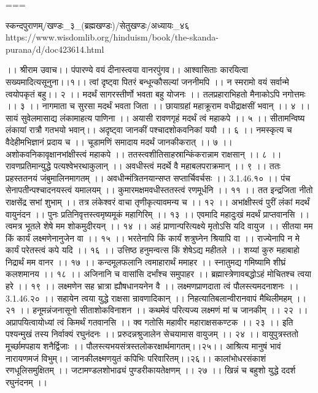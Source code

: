 ===

स्कन्दपुराणम्/खण्डः_३_(ब्रह्मखण्डः)/सेतुखण्डः/अध्यायः_४६
https://www.wisdomlib.org/hinduism/book/the-skanda-purana/d/doc423614.html

।। श्रीराम उवाच।।
पंपारण्ये वयं दीनास्त्वया वानरपुंगव।।
आश्वासिताः कारयित्वा सख्यमादित्यसूनुना।।१।।
त्वां दृष्ट्वा पितरं बन्धून्कौसल्यां जननीमपि ।।
न स्मरामो वयं सर्वान्मे त्वयोपकृतं बहु।। २ ।।
मदर्थं सागरस्तीर्णो भवता बहु योजनः ।।
तलप्रहाराभिहतो मैनाकोऽपि नगोत्तमः ।। ३ ।।
नागमाता च सुरसा मदर्थं भवता जिता ।।
छायाग्रहां महाक्रूराम वधीद्राक्षसीं भवान् ।। ४ ।।
सायं सुवेलमासाद्य लंकामाहत्य पाणिना ।।
अयासी रावणगृहं मदर्थं त्वं महाकपे ।। ५ ।।
सीतामन्विष्य लंकायां रात्रौ गतभयो भवान्।।
अदृष्ट्वा जानकीं पश्चादशोकवनिकां ययौ ।। ६ ।।
नमस्कृत्य च वैदेहीमभिज्ञानं प्रदाय च ।।
चूडामणिं समादाय मदर्थं जानकीकरात् ।। ७ ।।
अशोकवनिकावृक्षानभांक्षीस्त्वं महाकपे ।।
ततस्त्वशीतिसाहस्रान्किंकरान्नाम राक्षसान् ।। ८ ।।
रावणप्रतिमान्युद्धे पत्यश्वेभरथाकुलान् ।।
अवधीस्त्वं मदर्थे वै महाबलपराक्रमान् ।। ९ ।।
ततः प्रहस्ततनयं जंबुमालिनमागतम् ।।
अवधीन्मंत्रितनयान्सप्त सप्तार्चिवर्चसः ।। 3.1.46.१० ।।
पंच सेनापतीन्पश्चादनयस्त्वं यमालयम् ।।
कुमारमक्षमवधीस्ततस्त्वं रणमूर्धनि ।। ११ ।।
तत इन्द्रजिता नीतो राक्षसेंद्र सभां शुभाम् ।।
तत्र लंकेश्वरं वाचा तृणीकृत्यावमन्य च ।। १२ ।।
अभांक्षीस्त्वं पुरीं लंकां मदर्थं वायुनंदन ।।
पुनः प्रतिनिवृत्तस्त्वमृष्यमूकं महागिरिम् ।। १३ ।।
एवमादि महादुःखं मदर्थं प्राप्तवानसि ।।
त्वमत्र भूतले शेषे मम शोकमुदीरयन् ।। १४ ।।
अहं प्राणान्परित्यक्ष्ये मृतोऽसि यदि वायुज ।।
सीतया मम किं कार्यं लक्ष्मणेनानुजेन वा ।। १५ ।।
भरतेनापि किं कार्यं शत्रुघ्नेन श्रियापि वा ।।
राज्येनापि न मे कार्यं परेतस्त्वं कपे यदि ।। १६ ।।
उत्तिष्ठ हनुमन्वत्स किं शेषेऽद्य महीतले ।।
शय्यां कुरु महाबाहो निद्रार्थं मम वानर ।। १७ ।।
कन्दमूलफलानि त्वमाहारार्थं ममाहर ।।
स्नातुमद्य गमिष्यामि शीघ्रं कलशमानय ।। १८ ।।
अजिनानि च वासांसि दर्भांश्च समुपाहर ।।
ब्रह्मास्त्रेणावबद्धोऽहं मोचितश्च त्वया हरे ।। १९ ।।
लक्ष्मणेन सह भ्रात्रा ह्यौषधानयनेन वै ।।
लक्ष्मणप्राणदाता त्वं पौलस्त्यमदनाशनः ।। 3.1.46.२० ।।
सहायेन त्वया युद्धे राक्षसा न्रावणादिकान् ।।
निहत्यातिबलान्वीरानवापं मैथिलीमहम् ।। २१ ।।
हनूमन्नंजनासूनो सीताशोकविनाशन ।।
कथमेवं परित्यज्य लक्ष्मणं मां च जानकीम् ।। २२ ।।
अप्रापयित्वायोध्यां त्वं किमर्थं गतवानसि ।।
क्व गतोसि महावीर महाराक्षसकण्टक ।। २३ ।।
इति पश्यन्मुखं तस्य निर्वाक्यं रघुनंदनः ।।
प्ररुदन्नश्रुजालेन सेचयामास वायुजम् ।। २४ ।।
वायुपुत्रस्ततो मूर्च्छामपहाय शनैर्द्विजाः ।।
पौलस्त्यभयसंत्रस्तलोकरक्षार्थमागतम्।।२५।।
आश्रित्य मानुषं भावं नारायणमजं विभुम्।।
जानकीलक्ष्मणयुतं कपिभिः परिवारितम्।।२६।।
कालांभोधरसंकाशं रणधूलिसमुक्षितम् ।।
जटामण्डलशोभाढ्यं पुण्डरीकायतेक्षणम् ।। २७ ।।
खिन्नं च बहुशो युद्धे ददर्श रघुनंदनम् ।।
